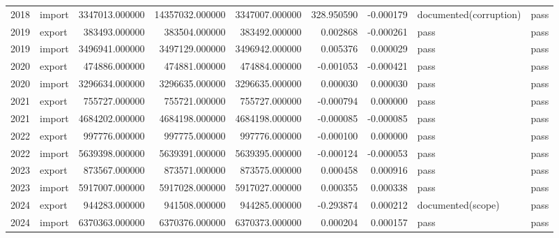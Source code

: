 \begin{tabular}{rlrrrrrll}
2018 & import & 3347013.000000 & 14357032.000000 & 3347007.000000 & 328.950590 & -0.000179 & documented(corruption) & pass \\
2019 & export & 383493.000000 & 383504.000000 & 383492.000000 & 0.002868 & -0.000261 & pass & pass \\
2019 & import & 3496941.000000 & 3497129.000000 & 3496942.000000 & 0.005376 & 0.000029 & pass & pass \\
2020 & export & 474886.000000 & 474881.000000 & 474884.000000 & -0.001053 & -0.000421 & pass & pass \\
2020 & import & 3296634.000000 & 3296635.000000 & 3296635.000000 & 0.000030 & 0.000030 & pass & pass \\
2021 & export & 755727.000000 & 755721.000000 & 755727.000000 & -0.000794 & 0.000000 & pass & pass \\
2021 & import & 4684202.000000 & 4684198.000000 & 4684198.000000 & -0.000085 & -0.000085 & pass & pass \\
2022 & export & 997776.000000 & 997775.000000 & 997776.000000 & -0.000100 & 0.000000 & pass & pass \\
2022 & import & 5639398.000000 & 5639391.000000 & 5639395.000000 & -0.000124 & -0.000053 & pass & pass \\
2023 & export & 873567.000000 & 873571.000000 & 873575.000000 & 0.000458 & 0.000916 & pass & pass \\
2023 & import & 5917007.000000 & 5917028.000000 & 5917027.000000 & 0.000355 & 0.000338 & pass & pass \\
2024 & export & 944283.000000 & 941508.000000 & 944285.000000 & -0.293874 & 0.000212 & documented(scope) & pass \\
2024 & import & 6370363.000000 & 6370376.000000 & 6370373.000000 & 0.000204 & 0.000157 & pass & pass \\
\bottomrule
\end{tabular}
